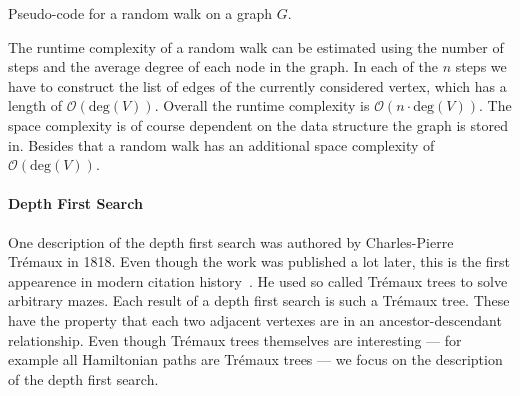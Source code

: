             \begin{algorithm}[htp]
                \hrulealg
            \caption{Pseudo-code for a random walk on a graph $G$.}\label{random_walk}
            \end{algorithm}
            
            The runtime complexity of a random walk can be estimated using the number of steps and the average degree of each node in the graph. In each of the $n$ steps we have to construct the list of edges of the currently considered vertex, which has a length of $\mathcal{O}(\text{deg}(V))$. Overall the runtime complexity is $\mathcal{O}(n \cdot \text{deg}(V))$. The space complexity is of course dependent on the data structure the graph is stored in. Besides that a random walk has an additional space complexity of $\mathcal{O}(\text{deg}(V))$. \\

        \paragraph{Depth First Search}
        One description of the depth first search was authored by Charles-Pierre Trémaux in 1818. Even though the work was published a lot later, this is the first appearence in modern citation history~\autocite{lucas1891recreations}. He used so called Trémaux trees to solve arbitrary mazes. Each result of a depth first search is such a Trémaux tree. These have the property that each two adjacent vertexes are in an ancestor-descendant relationship. Even though Trémaux trees themselves are interesting --- for example all Hamiltonian paths are Trémaux trees --- we focus on the description of the depth first search. \\
        

